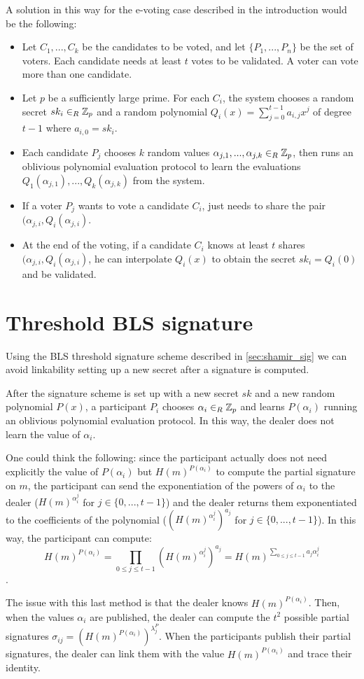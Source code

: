 A solution in this way for the e-voting case described in the introduction would be the following:
\begin{itemize}[align = left, leftmargin=*, label={--}]
\item Let $C_1, ..., C_k$ be the candidates to be voted, and let $\{P_1, ..., P_n\}$ be the set of voters. Each candidate needs at least $t$ votes to be validated. A voter can vote more than one candidate.
\item Let $p$ be a sufficiently large prime. For each $C_i$, the system chooses a random secret $sk_i \in_R {\mathbb Z}_p$ and a random polynomial $Q_i(x) = \sum_{j=0}^{t-1} a_{i,j} x^j$ of degree $t-1$ where $a_{i,0} = sk_i$.
\item Each candidate $P_j$ chooses $k$ random values $\alpha_{j,1}, ..., \alpha_{j,k} \in_R {\mathbb Z}_p$, then runs an oblivious polynomial evaluation protocol to learn the evaluations $Q_1(\alpha_{j,1}), ..., Q_k(\alpha_{j,k})$ from the system.
\item If a voter $P_j$ wants to vote a candidate $C_i$, just needs to share the pair $(\alpha_{j,i},Q_i(\alpha_{j,i})$.
\item At the end of the voting, if a candidate $C_i$ knows at least $t$ shares $(\alpha_{j,i},Q_i(\alpha_{j,i})$, he can interpolate $Q_i(x)$ to obtain the secret $sk_i = Q_i(0)$ and be validated.
\end{itemize}

\section{Threshold BLS signature}
\label{sec:thr_bls}
Using the BLS threshold signature scheme described in \ref{sec:shamir_sig} we can avoid linkability setting up a new secret after a signature is computed.

After the signature scheme is set up with a new secret $sk$ and a new random polynomial $P(x)$, a participant $P_i$ chooses $\alpha_i \in_R {\mathbb Z}_p$ and learns $P(\alpha_i)$ running an oblivious polynomial evaluation protocol. In this way, the dealer does not learn the value of $\alpha_i$.

One could think the following: since the participant actually does not need explicitly the value of $P(\alpha_i)$ but $H(m)^{P(\alpha_i)}$ to compute the partial signature on $m$, the participant can send the exponentiation of the powers of $\alpha_i$ to the dealer ($H(m)^{\alpha_i^j}$ for $j \in \{0, ..., t-1 \}$) and the dealer returns them exponentiated to the coefficients of the polynomial ($\left(H(m)^{\alpha_i^j}\right)^{a_j}$ for $j \in \{0, ..., t-1 \}$). In this way, the participant can compute: $$H(m)^{P(\alpha_i)} = \prod_{0\leq j \leq t-1} \left(H(m)^{\alpha_i^j}\right)^{a_j} = H(m)^{\sum_{0\leq j \leq t-1} a_j \alpha_i^j}$$.

The issue with this last method is that the dealer knows $H(m)^{P(\alpha_i)}$. Then, when the values $\alpha_i$ are published, the dealer can compute the $t^2$ possible partial signatures ${\sigma_{ij} = \left( H(m)^{P(\alpha_i)} \right)^{\lambda_j^P}}$. When the participants publish their partial signatures, the dealer can link them with the value  $H(m)^{P(\alpha_i)}$ and trace their identity.